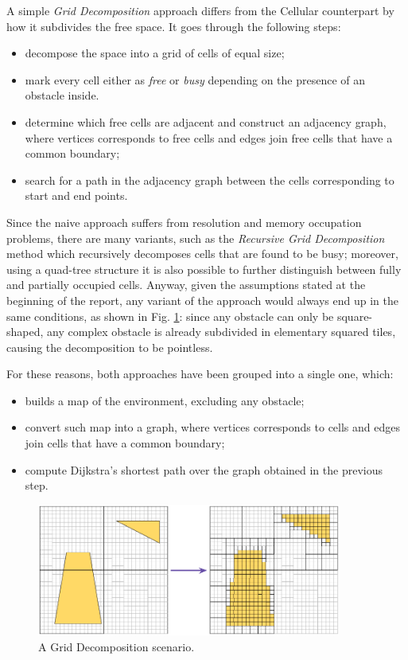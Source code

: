 \documentclass[conference]{IEEEtran}
\begin{document}
A simple \emph{Grid Decomposition} approach differs from the Cellular counterpart by how it subdivides the free space. It goes through the following steps:
\begin{itemize}
	\item decompose the space into a grid of cells of equal size;
	\item mark every cell either as \emph{free} or \emph{busy} depending on the presence of an obstacle inside.
	\item determine which free cells are adjacent and construct an adjacency graph, where vertices corresponds to free cells and edges join free cells that have a common boundary;
	\item search for a path in the adjacency graph between the cells corresponding to start and end points.
\end{itemize}

Since the naive approach suffers from resolution and memory occupation problems, there are many variants, such as the \emph{Recursive Grid Decomposition} method which recursively decomposes cells that are found to be busy; moreover, using a quad-tree structure it is also possible to further distinguish between fully and partially occupied cells.
Anyway, given the assumptions stated at the beginning of the report, any variant of the approach would always end up in the same conditions, as shown in Fig. \ref{fig:grid_decomposition}: since any obstacle can only be square-shaped, any complex obstacle is already subdivided in elementary squared tiles, causing the decomposition to be pointless.

For these reasons, both approaches have been grouped into a single one, which:
\begin{itemize}
	\item builds a map of the environment, excluding any obstacle;
	\item convert such map into a graph, where vertices corresponds to cells and edges join cells that have a common boundary;
	\item compute Dijkstra's shortest path over the graph obtained in the previous step.
\end{itemize}

\begin{figure}[]
	\includegraphics[width=10cm]{grid_decomposition.png}
	\centering
	\caption{A Grid Decomposition scenario.}
	\label{fig:grid_decomposition}
\end{figure}
\end{document}
